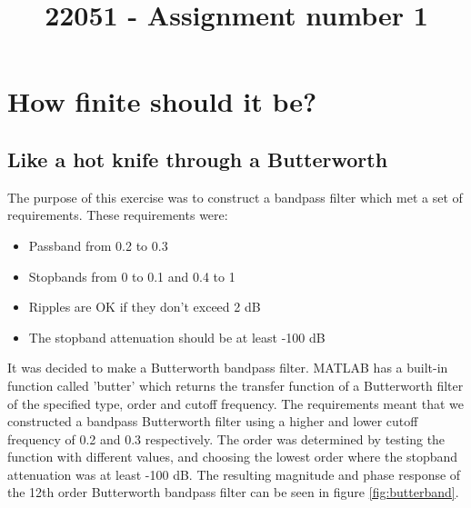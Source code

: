 \documentclass[journal]{IEEEtran}
\begin{document}
\title{22051 - Assignment number 1}
\author{\vspace{-10mm}}

\maketitle

\section{How finite should it be?}

\subsection{Like a hot knife through a Butterworth}
The purpose of this exercise was to construct a bandpass filter which met a set of requirements. These requirements were:
\begin{itemize}
\item Passband from 0.2 to 0.3
\item Stopbands from 0 to 0.1 and 0.4 to 1
\item Ripples are OK if they don't exceed 2 dB
\item The stopband attenuation should be at least -100 dB
\end{itemize}

It was decided to make a Butterworth bandpass filter. MATLAB has a built-in function called 'butter' which returns the transfer function of a Butterworth filter of the specified type, order and cutoff frequency. 
\newline
The requirements meant that we constructed a bandpass Butterworth filter using a higher and lower cutoff frequency of 0.2 and 0.3 respectively. The order was determined by testing the function with different values, and choosing the lowest order where the stopband attenuation was at least -100 dB. The resulting magnitude and phase response of the 12th order Butterworth bandpass filter can be seen in figure \ref{fig:butterband}.
\end{document}
